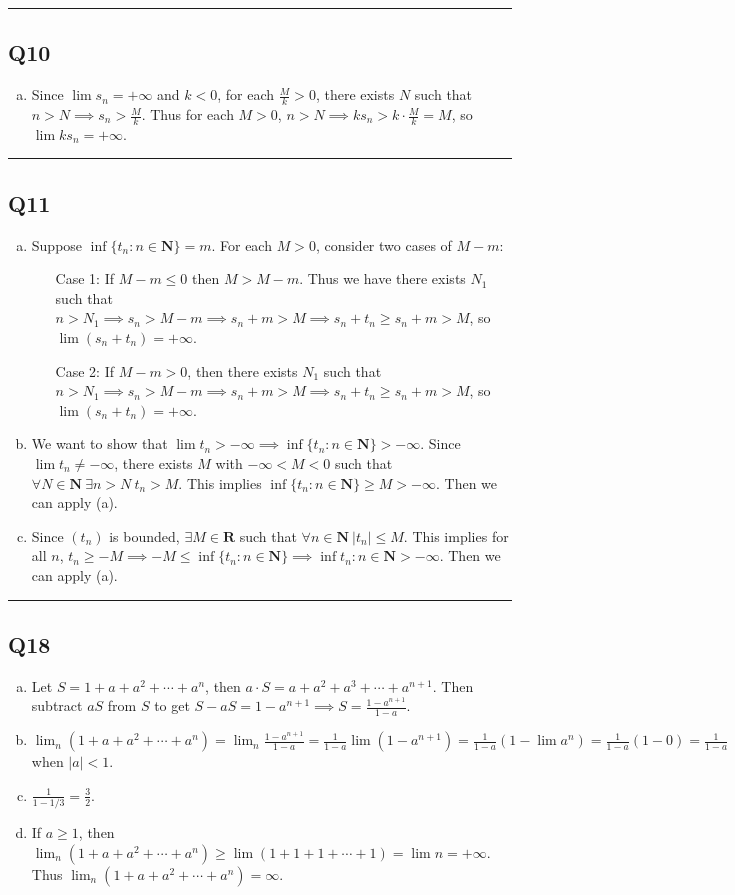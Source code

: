 \documentclass[12pt, lettersize]{article}
\newcommand{\R}{\mathbf{R}}
\newcommand{\N}{\mathbf{N}}
\newcommand{\lline}{\noindent\rule{\textwidth}{1pt}}
\begin{document}
	\lline
	
	\subsection*{Q10}
	\begin{enumerate}[(a)]
		\item Since $\lim s_n=+\infty$ and $k<0$, for each $\frac{M}{k}>0$, there exists $N$ such that $n>N\implies s_n>\frac{M}{k}$. Thus for each $M>0$, $n>N\implies ks_n>k\cdot\frac{M}{k}=M$, so $\lim ks_n=+\infty$.
	\end{enumerate}

	\lline
	
	\subsection*{Q11}
	\begin{enumerate}[(a)]
		\item Suppose $\inf\{t_n: n\in\N\}=m$. For each $M>0$, consider two cases of $M-m$:
		\begin{itemize}
			\item[Case 1:] If $M-m\leq0$ then $M>M-m$. Thus we have there exists $N_1$ such that $n>N_1\implies s_n>M-m\implies s_n+m>M\implies s_n+t_n\geq s_n+m>M$, so $\lim(s_n+t_n)=+\infty$.
			\item[Case 2:] If $M-m>0$, then there exists $N_1$ such that $n>N_1\implies s_n>M-m\implies s_n+m>M\implies s_n+t_n\geq s_n+m>M$, so $\lim(s_n+t_n)=+\infty$.  
		\end{itemize}
		\item We want to show that $\lim t_n>-\infty\implies \inf\{t_n: n\in\N\}>-\infty$. Since $\lim t_n\neq-\infty$, there exists $M$ with $-\infty<M<0$ such that $\forall N\in\N\ \exists n>N\ t_n>M$. This implies $\inf\{t_n: n\in \N\}\geq M>-\infty$. Then we can apply (a).
		\item Since $(t_n)$ is bounded, $\exists M\in\R$ such that $\forall n\in\N\ |t_n|\leq M$. This implies for all $n$, $t_n\geq -M\implies -M\leq\inf\{t_n: n\in\N\}\implies \inf{t_n: n\in\N}>-\infty$. Then we can apply (a).
	\end{enumerate}
	
	\lline
	
	\subsection*{Q18}
	\begin{enumerate}[(a)]
		\item Let $S=1+a+a^2+\cdots+a^n$, then $a\cdot S=a+a^2+a^3+\cdots+a^{n+1}$. Then subtract $aS$ from $S$ to get $S-aS=1-a^{n+1}\implies S=\frac{1-a^{n+1}}{1-a}$.
		\item $\lim_n(1+a+a^2+\cdots+a^n)=\lim_n\frac{1-a^{n+1}}{1-a}=\frac{1}{1-a}\lim(1-a^{n+1})=\frac{1}{1-a}(1-\lim a^{n})=\frac{1}{1-a}(1-0)=\frac{1}{1-a}$ when $|a|<1$.
		\item $\frac{1}{1-1/3}=\frac{3}{2}$.
		\item If $a\geq1$, then $\lim_n(1+a+a^2+\cdots+a^n)\geq\lim(1+1+1+\cdots+1)=\lim n=+\infty$. Thus $\lim_n(1+a+a^2+\cdots+a^n)=\infty$.
	\end{enumerate}
	
\end{document}
